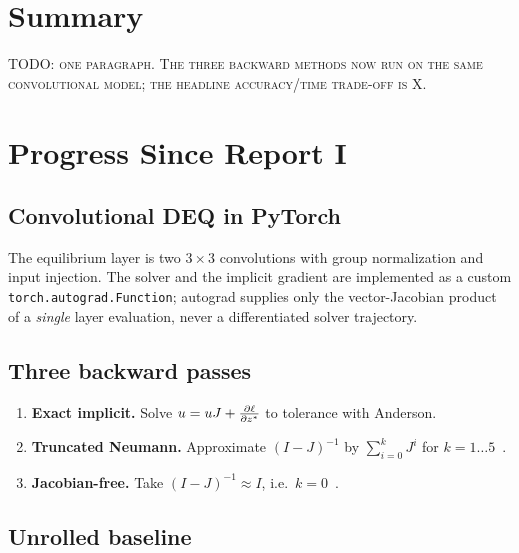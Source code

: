\documentclass[11pt]{article}
\begin{document}
\makeheader

\section{Summary}

\textsc{TODO: one paragraph. The three backward methods now run on the same
convolutional model; the headline accuracy/time trade-off is X.}

\section{Progress Since Report I}

\subsection{Convolutional DEQ in PyTorch}

The equilibrium layer is two $3\times3$ convolutions with group normalization
and input injection. The solver and the implicit gradient are implemented as a
custom \texttt{torch.autograd.Function}; autograd supplies only the
vector-Jacobian product of a \emph{single} layer evaluation, never a
differentiated solver trajectory.

\subsection{Three backward passes}

\begin{enumerate}
  \item \textbf{Exact implicit.} Solve $u = uJ + \frac{\partial \ell}{\partial z^{*}}$ to
    tolerance with Anderson.
  \item \textbf{Truncated Neumann.} Approximate $(I-J)^{-1}$ by
    $\sum_{i=0}^{k} J^i$ for $k = 1 \ldots 5$~\cite{geng2021training}.
  \item \textbf{Jacobian-free.} Take $(I-J)^{-1} \approx I$, i.e.\
    $k = 0$~\cite{fung2022jfb}.
\end{enumerate}

\subsection{Unrolled baseline}
\end{document}
